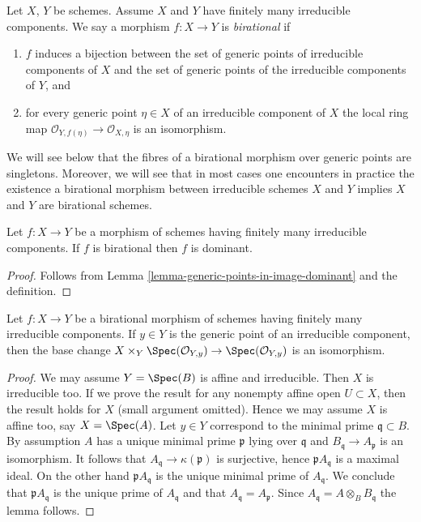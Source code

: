 \begin{definition}
\label{definition-birational}
\begin{reference}
\cite[(2.2.9)]{EGA1}
\end{reference}
Let $X$, $Y$ be schemes. Assume $X$ and $Y$ have finitely many
irreducible components. We say a morphism $f : X \to Y$ is
{\it birational} if
\begin{enumerate}
\item $f$ induces a bijection between the set of generic points
of irreducible components of $X$ and the set of generic points
of the irreducible components of $Y$, and
\item for every generic point $\eta \in X$ of an irreducible component
of $X$ the local ring map
$\mathcal{O}_{Y, f(\eta)} \to \mathcal{O}_{X, \eta}$
is an isomorphism.
\end{enumerate}
\end{definition}

\noindent
We will see below that the fibres of a birational morphism
over generic points are singletons. Moreover, we will see that
in most cases one encounters in practice the existence a birational morphism
between irreducible schemes $X$ and $Y$ implies
$X$ and $Y$ are birational schemes.

\begin{lemma}
\label{lemma-birational-dominant}
Let $f : X \to Y$ be a morphism of schemes having finitely
many irreducible components. If $f$ is birational then
$f$ is dominant.
\end{lemma}

\begin{proof}
Follows from Lemma \ref{lemma-generic-points-in-image-dominant}
and the definition.
\end{proof}

\begin{lemma}
\label{lemma-birational-generic-fibres}
Let $f : X \to Y$ be a birational morphism of schemes having finitely
many irreducible components. If $y \in Y$ is the generic point of
an irreducible component, then the base change
$X \times_Y \Spec(\mathcal{O}_{Y, y}) \to \Spec(\mathcal{O}_{Y, y})$
is an isomorphism.
\end{lemma}

\begin{proof}
We may assume $Y = \Spec(B)$ is affine and irreducible.
Then $X$ is irreducible too. If we prove the result for any nonempty
affine open $U \subset X$, then the result holds for $X$
(small argument omitted). Hence we may assume $X$
is affine too, say $X = \Spec(A)$.
Let $y \in Y$ correspond to the minimal prime $\mathfrak q \subset B$.
By assumption $A$ has a unique minimal prime $\mathfrak p$ lying
over $\mathfrak q$ and $B_\mathfrak q \to A_\mathfrak p$ is an isomorphism.
It follows that $A_\mathfrak q \to \kappa(\mathfrak p)$ is surjective,
hence $\mathfrak p A_\mathfrak q$ is a maximal ideal. On the other hand
$\mathfrak p A_\mathfrak q$ is the unique minimal prime of $A_\mathfrak q$.
We conclude that $\mathfrak p A_\mathfrak q$ is the unique prime of
$A_\mathfrak q$ and that $A_\mathfrak q = A_\mathfrak p$. Since
$A_\mathfrak q = A \otimes_B B_\mathfrak q$ the lemma follows.
\end{proof}

